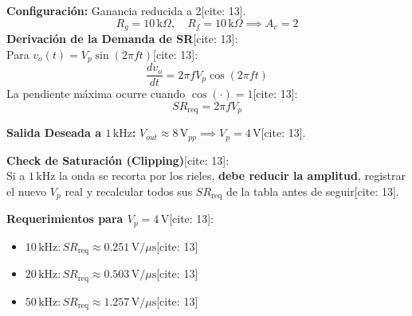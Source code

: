 \documentclass[11pt, a4paper]{article}
\begin{document}
\vspace{0.3cm}
\begin{minipage}{0.45\textwidth}
    \raggedright
    \textbf{Configuración:} Ganancia reducida a 2[cite: 13].
    \begin{equation*}
        R_g = 10\,\text{k}\Omega, \quad R_f = 10\,\text{k}\Omega \implies A_v = 2
    \end{equation*}
    \textbf{Derivación de la Demanda de SR}[cite: 13]: \\
    Para $v_o(t) = V_p \sin(2\pi f t)$[cite: 13]:
    \begin{equation*}
        \frac{dv_o}{dt} = 2\pi f V_p \cos(2\pi f t)
    \end{equation*}
    La pendiente máxima ocurre cuando $\cos(\cdot) = 1$[cite: 13]:
    \begin{equation*}
        \boxed{ SR_{\mathrm{req}} = 2\pi f V_p }
    \end{equation*}
\end{minipage}
\hfill
\begin{minipage}{0.5\textwidth}
    \raggedright
    \textbf{Salida Deseada a $1\,\text{kHz}$:} $V_{out} \approx 8\,\text{V}_{pp} \implies V_p = 4\,\text{V}$[cite: 13].
    
    \vspace{0.2cm}
    \textbf{Check de Saturación (Clipping)}[cite: 13]: \\
    Si a $1\,\text{kHz}$ la onda se recorta por los rieles, \textbf{debe reducir la amplitud}, registrar el nuevo $V_p$ real y recalcular todos sus $SR_{\mathrm{req}}$ de la tabla antes de seguir[cite: 13].
    
    \vspace{0.2cm}
    \textbf{Requerimientos para $V_p = 4\,\text{V}$}[cite: 13]:
    \begin{itemize}
        \item $10\,\text{kHz}: SR_{\mathrm{req}} \approx 0.251\,\text{V}/\mu\text{s}$[cite: 13]
        \item $20\,\text{kHz}: SR_{\mathrm{req}} \approx 0.503\,\text{V}/\mu\text{s}$[cite: 13]
        \item $50\,\text{kHz}: SR_{\mathrm{req}} \approx 1.257\,\text{V}/\mu\text{s}$[cite: 13]
    \end{itemize}
\end{minipage}
\end{document}
